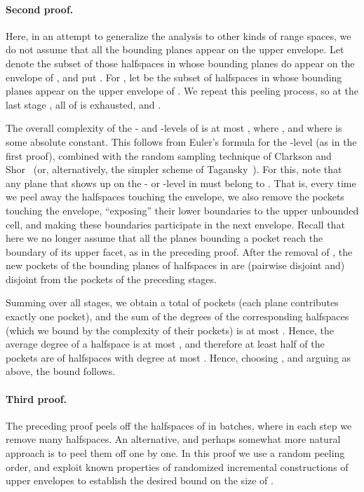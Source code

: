 \documentclass[12pt]{article}
\begin{document}
\paragraph{Second proof.}
Here, in an attempt to generalize the analysis to other kinds of range
spaces, we do not assume that all the bounding planes appear on the
upper envelope. Let  denote the subset of those halfspaces in
 whose bounding planes do appear on the envelope of , and put
. For , let  be the subset of halfspaces
in  whose bounding
planes appear on the upper envelope of . We repeat this peeling
process, so at the last stage , all of  is exhausted, and
.

The overall complexity of the - and -levels of  is at
most , where , and where  is
some absolute constant. This follows from Euler's formula for the
-level (as in the first proof), combined with the random sampling
technique of Clarkson and Shor~\cite{cs-arscg-89} (or, alternatively,
the simpler scheme of Tagansky~\cite{t-ntasa-96}).  For this, note
that any plane that shows up on the - or -level in 
must belong to .  That is, every time we peel away
the halfspaces touching the envelope, we also remove the pockets
touching the envelope, ``exposing'' their lower boundaries to the
upper unbounded cell, and making these boundaries participate in the
next envelope.  Recall that here we no longer assume that all the
planes bounding a pocket reach the boundary of its upper facet, as in
the preceding proof.  After the removal of , the new pockets of
the bounding planes of halfspaces in  are (pairwise disjoint
and) disjoint from the pockets of the preceding stages.

Summing over all stages, we obtain a total of 
pockets (each plane contributes exactly one pocket), and the sum of
the degrees of the corresponding halfspaces (which we bound by the
complexity of their pockets) is at most
.
Hence, the average degree of a halfspace is at most ,
and therefore at least half of the pockets are of halfspaces with
degree at most . Hence, choosing , and arguing
as above, the bound  follows.


\paragraph{Third proof.}
The preceding proof peels off the halfspaces of  in batches, where
in each step we remove many halfspaces. An alternative, and perhaps
somewhat more natural approach is to peel them off one by one.
In this proof we use a random peeling order, and exploit known properties
of randomized incremental constructions of upper envelopes to
establish the desired bound on the size of .
\end{document}
